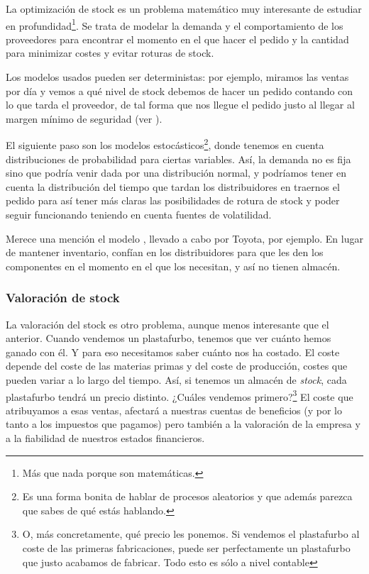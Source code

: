 \documentclass[nochap,palatino,shortheader]{apuntes}
\newcommand{\study}[1]{#1} \newcommand{\substudy}[1]{#1}
\begin{document}
La optimización de stock es un problema matemático muy interesante de estudiar en profundidad\footnote{Más que nada porque son matemáticas.}. Se trata de modelar la demanda y el comportamiento de los proveedores para encontrar el momento en el que hacer el pedido y la cantidad para minimizar costes y evitar roturas de stock.

Los \study{modelos} usados pueden ser \study{deterministas}: por ejemplo, miramos las ventas por día y vemos a qué nivel de stock debemos de hacer un pedido contando con lo que tarda el proveedor, de tal forma que nos llegue el pedido justo al llegar al margen mínimo de seguridad (ver ).

El siguiente paso son los \study{modelos estocásticos}\footnote{Es una forma bonita de hablar de procesos aleatorios y que además parezca que sabes de qué estás hablando.}, donde tenemos en cuenta distribuciones de probabilidad para ciertas variables.
Así, la demanda no es fija sino que podría venir dada por una distribución normal, y podríamos tener en cuenta la distribución del tiempo que tardan los distribuidores en traernos el pedido para así tener más claras las posibilidades de rotura de stock y poder seguir funcionando teniendo en cuenta fuentes de volatilidad.

Merece una mención el modelo , llevado a cabo por Toyota, por ejemplo. En lugar de mantener inventario, confían en los distribuidores para que les den los componentes en el momento en el que los necesitan, y así no tienen almacén.

\subsubsection{Valoración de stock}

La valoración del stock es otro problema, aunque menos interesante que el anterior. Cuando vendemos un plastafurbo, tenemos que ver cuánto hemos ganado con él. Y para eso necesitamos saber cuánto nos ha costado. El coste depende del coste de las materias primas y del coste de producción, costes que pueden variar a lo largo del tiempo. Así, si tenemos un almacén de \textit{stock}, cada plastafurbo tendrá un precio distinto. ¿Cuáles vendemos primero?\footnote{O, más concretamente, qué precio les ponemos. Si vendemos el plastafurbo al coste de las primeras fabricaciones, puede ser perfectamente un plastafurbo que justo acabamos de fabricar. Todo esto es sólo a nivel contable } El coste que atribuyamos a esas ventas, afectará a nuestras cuentas de beneficios (y por lo tanto a los impuestos que pagamos) pero también a la valoración de la empresa y a la fiabilidad de nuestros estados financieros.
\end{document}
